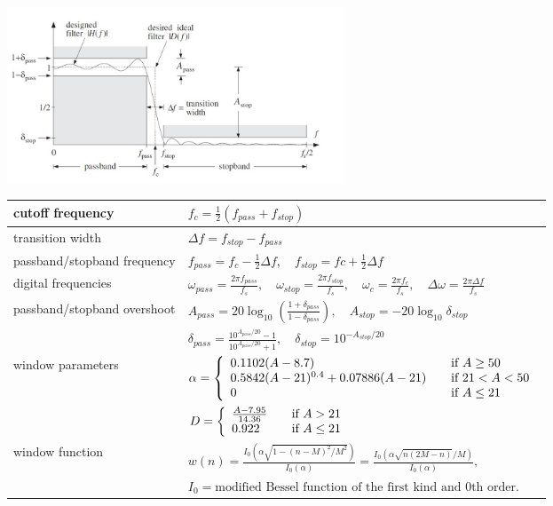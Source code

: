 \begin{center}
	\includegraphics[width=10cm]{images/FIR_KaiserSpecs.jpg}
\end{center}

\begin{tabular}{|l|l|}
	\hline
	cutoff frequency & $f_c=\frac{1}{2}(f_{pass}+f_{stop})$ \\ \hline
	transition width & $\Delta f = f_{stop}-f_{pass}$\\ \hline
	passband/stopband frequency & $f_{pass} = f_c - \frac{1}{2}\Delta f,\quad f_{stop}= fc+\frac{1}{2}\Delta f$\\ \hline
	digital frequencies & $\omega_{pass}=\frac{2\pi f_{pass}}{f_s},\quad \omega_{stop}=\frac{2\pi f_{stop}}{f_s},\quad
						  \omega_{c}=\frac{2\pi f_c}{f_s},\quad \Delta\omega=\frac{2\pi \Delta f}{f_s}$\\ \hline
	passband/stopband overshoot & $A_{pass}=20\log_{10}\left(\frac{1+\delta_{pass}}{1-\delta_{pass}}\right),\quad A_{stop}=-20\log_{10}\delta_{stop}$\\
								& $\delta_{pass}=\frac{10^{A_{pass}/20}-1}{10^{A_{pass}/20}+1},\quad \delta_{stop} = 10^{-A_{stop}/20}$ \\ \hline
	window parameters &
		$\alpha = \left\{
					\begin{array}{l l}
						0.1102(A-8.7)& \quad \text{if } A \geq 50\\
						0.5842(A-21)^{0.4}+0.07886(A-21) & \quad \text{if }21 < A < 50\\
						0 & \quad \text{if } A \leq 21
					\end{array} \right. $\\
	&	$D = \left\{
					\begin{array}{l l}
						\frac{A-7.95}{14.36}& \quad \text{if } A>21\\
						0.922 & \quad \text{if } A \leq 21
					\end{array} \right. $\\ \hline
	window function & $w(n)=\frac{I_0(\alpha\sqrt{1-(n-M)^2/M^2})}{I_0(\alpha)}=\frac{I_0(\alpha\sqrt{n(2M-n)}/M)}{I_0(\alpha)},$ \\
	& $I_0=\text{modified Bessel function of the first kind and 0th order.}$\\
	\hline
\end{tabular}

